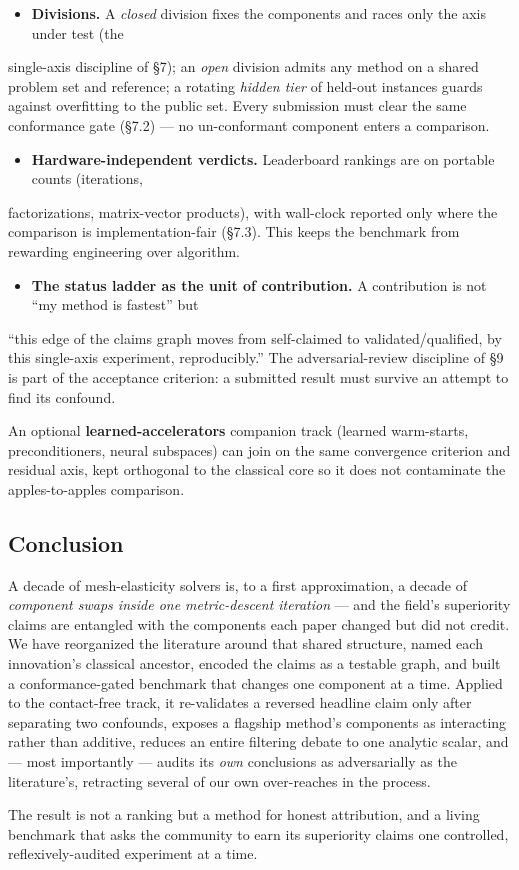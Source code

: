 \documentclass{egpubl}
\begin{document}
\begin{itemize}
  \item \textbf{Divisions.} A \emph{closed} division fixes the components and races only the axis under test (the
\end{itemize}
  single-axis discipline of \S7); an \emph{open} division admits any method on a shared problem set and
  reference; a rotating \emph{hidden tier} of held-out instances guards against overfitting to the public
  set. Every submission must clear the same conformance gate (\S7.2) --- no un-conformant component
  enters a comparison.
\begin{itemize}
  \item \textbf{Hardware-independent verdicts.} Leaderboard rankings are on portable counts (iterations,
\end{itemize}
  factorizations, matrix-vector products), with wall-clock reported only where the comparison is
  implementation-fair (\S7.3). This keeps the benchmark from rewarding engineering over algorithm.
\begin{itemize}
  \item \textbf{The status ladder as the unit of contribution.} A contribution is not ``my method is fastest'' but
\end{itemize}
  ``this edge of the claims graph moves from self-claimed to validated/qualified, by this single-axis
  experiment, reproducibly.'' The adversarial-review discipline of \S9 is part of the acceptance
  criterion: a submitted result must survive an attempt to find its confound.

An optional \textbf{learned-accelerators} companion track (learned warm-starts, preconditioners, neural
subspaces) can join on the same convergence criterion and residual axis, kept orthogonal to the
classical core so it does not contaminate the apples-to-apples comparison.

\subsection{Conclusion}

A decade of mesh-elasticity solvers is, to a first approximation, a decade of \emph{component swaps inside
one metric-descent iteration} --- and the field's superiority claims are entangled with the components
each paper changed but did not credit. We have reorganized the literature around that shared structure,
named each innovation's classical ancestor, encoded the claims as a testable graph, and built a
conformance-gated benchmark that changes one component at a time. Applied to the contact-free track,
it re-validates a reversed headline claim only after separating two confounds, exposes a flagship
method's components as interacting rather than additive, reduces an entire filtering debate to one
analytic scalar, and --- most importantly --- audits its \emph{own} conclusions as adversarially as the
literature's, retracting several of our own over-reaches in the process.

The result is not a ranking but a method for honest attribution, and a living benchmark that asks the
community to earn its superiority claims one controlled, reflexively-audited experiment at a time.


\nocite{*}


\end{document}
